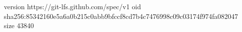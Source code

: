 version https://git-lfs.github.com/spec/v1
oid sha256:85342160e5a6a0b215c0abb9bfccf8cd7b4c7476998c09c03174f974fa082047
size 43840
